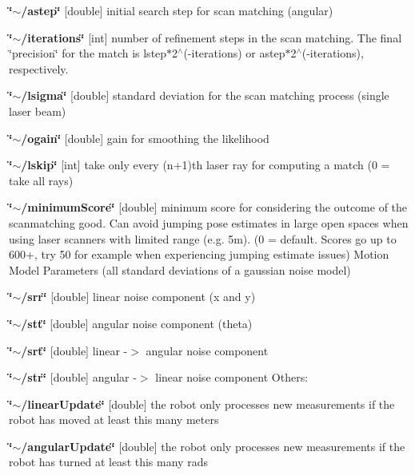 \begin{DoxyItemize}
\item {\bfseries \char`\"{}$\sim$/astep\char`\"{}} {\bfseries }\mbox{[}double\mbox{]} initial search step for scan matching (angular)
\item {\bfseries \char`\"{}$\sim$/iterations\char`\"{}} {\bfseries }\mbox{[}int\mbox{]} number of refinement steps in the scan matching. The final \char`\"{}precision\char`\"{} for the match is lstep$\ast$2$^\wedge$(-\/iterations) or astep$\ast$2$^\wedge$(-\/iterations), respectively.
\item {\bfseries \char`\"{}$\sim$/lsigma\char`\"{}} {\bfseries }\mbox{[}double\mbox{]} standard deviation for the scan matching process (single laser beam)
\item {\bfseries \char`\"{}$\sim$/ogain\char`\"{}} {\bfseries }\mbox{[}double\mbox{]} gain for smoothing the likelihood
\item {\bfseries \char`\"{}$\sim$/lskip\char`\"{}} {\bfseries }\mbox{[}int\mbox{]} take only every (n+1)th laser ray for computing a match (0 = take all rays)
\item {\bfseries \char`\"{}$\sim$/minimum\+Score\char`\"{}} {\bfseries }\mbox{[}double\mbox{]} minimum score for considering the outcome of the scanmatching good. Can avoid \textquotesingle{}jumping\textquotesingle{} pose estimates in large open spaces when using laser scanners with limited range (e.\+g. 5m). (0 = default. Scores go up to 600+, try 50 for example when experiencing \textquotesingle{}jumping\textquotesingle{} estimate issues) Motion Model Parameters (all standard deviations of a gaussian noise model)
\item {\bfseries \char`\"{}$\sim$/srr\char`\"{}} {\bfseries }\mbox{[}double\mbox{]} linear noise component (x and y)
\item {\bfseries \char`\"{}$\sim$/stt\char`\"{}} {\bfseries }\mbox{[}double\mbox{]} angular noise component (theta)
\item {\bfseries \char`\"{}$\sim$/srt\char`\"{}} {\bfseries }\mbox{[}double\mbox{]} linear -\/$>$ angular noise component
\item {\bfseries \char`\"{}$\sim$/str\char`\"{}} {\bfseries }\mbox{[}double\mbox{]} angular -\/$>$ linear noise component Others\+:
\item {\bfseries \char`\"{}$\sim$/linear\+Update\char`\"{}} {\bfseries }\mbox{[}double\mbox{]} the robot only processes new measurements if the robot has moved at least this many meters
\item {\bfseries \char`\"{}$\sim$/angular\+Update\char`\"{}} {\bfseries }\mbox{[}double\mbox{]} the robot only processes new measurements if the robot has turned at least this many rads

\end{DoxyItemize}
